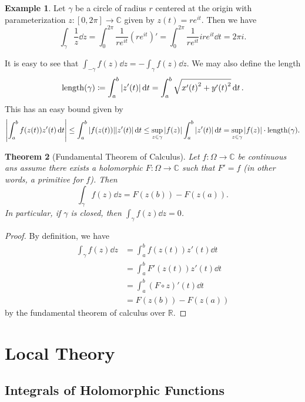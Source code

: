 \documentclass[leqno, openany]{memoir}
\newtheorem{thm}{Theorem}[section]
\theoremstyle{definition}
\newtheorem{exm}[thm]{Example}
\theoremstyle{remark}
\theoremstyle{plain}
\theoremstyle{definition}
\theoremstyle{remark}
\newcommand{\R}{\mathbb{R}}
\newcommand{\C}{\mathbb{C}}
\DeclareMathOperator{\len}{length}
\begin{document}
\begin{exm}
    Let $\gamma$ be a circle of radius $r$ centered at the origin with parameterization $z \colon [0,2\pi] \to \C$ given by $z(t) = re^{it}$. Then we have
    \[ \int_{\gamma} \frac{1}{z} \dd{z} = \int_0^{2 \pi} \frac{1}{re^{it}} {(re^{it})}' = \int_0^{2 \pi} \frac{1}{re^{it}} ire^{it} \dd{t} = 2 \pi i. \]
\end{exm}

It is easy to see that $\int_{- \gamma} f(z) \dd{z} = - \int_{\gamma} f(z) \dd{z}$. We may also define the length
\[ \len(\gamma) \coloneqq \int_a^b \abs{z'(t)} \dd{t} = \int_a^b \sqrt{ {x'(t)}^2 + {y'(t)}^2 } \dd{t}. \]
This has an easy bound given by
\[ \abs{ \int_a^b f(z(t)) z'(t) \dd{t} } \leq \int_a^b \abs{f(z(t))} \abs{z'(t)} \dd{t} \leq \sup_{z \in \gamma} \abs{f(z)} \int_a^b \abs{z'(t)} \dd{t} = \sup_{z \in \gamma} \abs{f(z)} \cdot \len(\gamma). \]

\begin{thm}[Fundamental Theorem of Calculus]
    Let $f \colon \Omega \to \C$ be continuous ans assume there exists a holomorphic $F \colon \Omega \to \C$ such that $F' = f$ (in other words, a \textit{primitive} for $f$). Then 
    \[ \int_{\gamma} f(z) \dd{z} = F(z(b)) - F(z(a)). \]
    In particular, if $\gamma$ is closed, then $\int_{\gamma} f(z) \dd{z} = 0$.
\end{thm}

\begin{proof}
    By definition, we have 
    \begin{align*}
        \int_{\gamma} f(z) \dd{z} &= \int_a^b f(z(t)) z'(t) \dd{t} \\
                                  &= \int_a^b F'(z(t)) z'(t) \dd{t} \\
                                  &= \int_a^b {(F \circ z)}'(t) \dd{t} \\
                                  &= F(z(b)) - F(z(a))
    \end{align*}
    by the fundamental theorem of calculus over $\R$.
\end{proof}

\chapter{Local Theory}%
\label{cha:local_theory}

\section{Integrals of Holomorphic Functions}%
\label{sec:integrals_of_holomorphic_functions}
\end{document}
